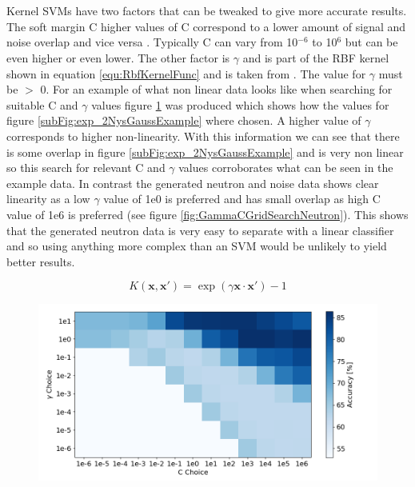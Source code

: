 \\\\Kernel SVMs have two factors that can be tweaked to give more accurate results. The soft margin C higher values of C correspond to a lower amount of signal and noise overlap and vice versa \cite{cortes1995support}. Typically C can vary from 10$^{-6}$ to 10$^6$ but can be even higher or even lower. The other factor is $\gamma$ and is part of the RBF kernel shown in equation \ref{equ:RbfKernelFunc} and is taken from \cite{Boser92atraining}. The value for $\gamma$ must be $>$ 0. For an example of what non linear data looks like when searching for suitable C and $\gamma$ values figure \ref{fig:GammaCGridSearchExp2Gauss} was produced which shows how the values for figure \ref{subFig:exp_2NysGaussExample} where chosen. A higher value of $\gamma$ corresponds to higher non-linearity. With this information we can see that there is some overlap in figure \ref{subFig:exp_2NysGaussExample} and is very non linear so this search for relevant C and $\gamma$ values corroborates what can be seen in the example data. In contrast the generated neutron and noise data shows clear linearity as a low $\gamma$ value of 1e0 is preferred and has small overlap as high C value of 1e6 is preferred (see figure \ref{fig:GammaCGridSearchNeutron}). This shows that the generated neutron data is very easy to separate with a linear classifier and so using anything more complex than an SVM would be unlikely to yield better results.

\begin{equation}
K(\mathbf{x,x'}) = \exp{(\gamma \mathbf{x \cdot x'})} - 1
\label{equ:RbfKernelFunc}
\end{equation}

\begin{figure}[htbp]
\centering
\includegraphics[width=0.9\linewidth]{Chapter4/Figs/Raster/GammaCGridSearchExp2Gauss.png}
\label{fig:GammaCGridSearchExp2Gauss}
\end{figure}

